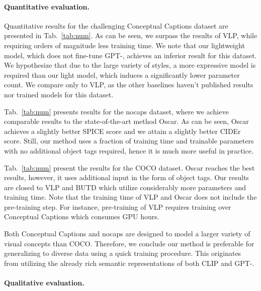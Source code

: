  

\paragraph{Quantitative evaluation.}


Quantitative results for the challenging Conceptual Captions dataset are presented in Tab.~\ref{tab:num}.
As can be seen, we surpass the results of VLP, while requiring orders of magnitude less training time. We note that our lightweight model, which does not fine-tune GPT-, achieves an inferior result for this dataset. We hypothesize that due to the large variety of styles, a more expressive model is required than our light model, which induces a significantly lower parameter count. We compare only to VLP, as the other baselines haven't published results nor trained models for this dataset.



Tab.~\ref{tab:num} presents results for the nocaps dataset, where we achieve comparable results to the state-of-the-art method Oscar. As can be seen, 
Oscar achieves a slightly better SPICE score and we attain a slightly better CIDEr score. Still, our method uses a fraction of training time and trainable parameters with no additional object tags required, hence it is much more useful in practice. 


Tab.~\ref{tab:num} present the results for the COCO dataset. Oscar reaches the best results, however, it uses additional input in the form of object tags. Our results are closed to VLP and BUTD which utilize considerably more parameters and training time. Note that the training time of VLP and Oscar does not include the pre-training step. For instance, pre-training of VLP requires training over Conceptual Captions which consumes  GPU hours. 




Both Conceptual Captions and nocaps are designed to model a larger variety of visual concepts than COCO. Therefore, we conclude our method is preferable for generalizing to diverse data using a quick training procedure. This originates from utilizing the already rich semantic representations of both CLIP and GPT-.





\paragraph{Qualitative evaluation.}

